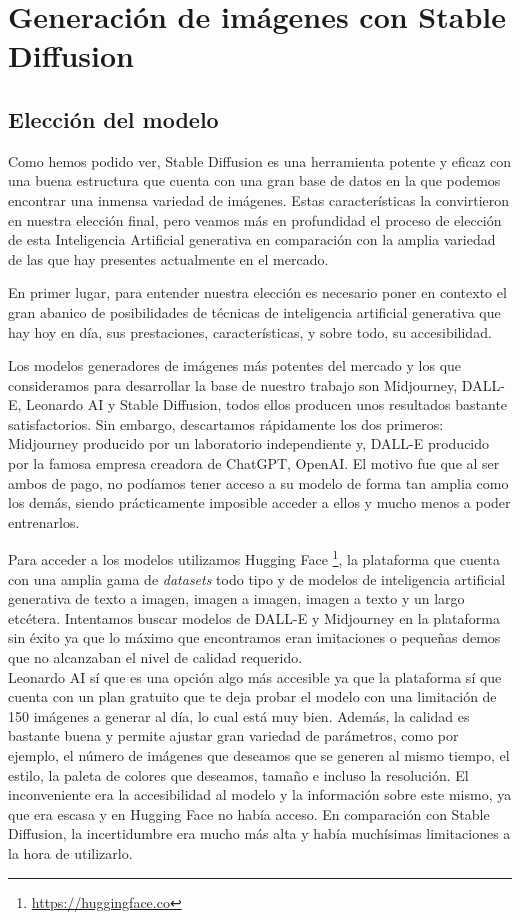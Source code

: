 \chapter{Generación de imágenes con Stable Diffusion}
\label{cap:genimgsia}

\section{Elección del modelo}

Como hemos podido ver, Stable Diffusion es una herramienta potente y eficaz con una buena estructura que cuenta con una gran base de datos en la que podemos encontrar una inmensa variedad de imágenes. Estas características la convirtieron en nuestra elección final, pero veamos más en profundidad el proceso de elección de esta Inteligencia Artificial generativa en comparación con la amplia variedad de las que hay presentes actualmente en el mercado. 

En primer lugar, para entender nuestra elección es necesario poner en contexto el gran abanico de posibilidades de técnicas de inteligencia artificial generativa que hay hoy en día, sus prestaciones, características, y sobre todo, su accesibilidad. 

Los modelos generadores de imágenes más potentes del mercado y los que consideramos para desarrollar la base de nuestro trabajo son Midjourney, DALL-E, Leonardo AI y Stable Diffusion, todos ellos producen unos resultados bastante satisfactorios. Sin embargo, descartamos rápidamente los dos primeros: Midjourney producido por un laboratorio independiente y,
DALL-E producido por la famosa empresa creadora de ChatGPT, OpenAI. El motivo fue que al ser ambos de pago, no podíamos tener acceso a su modelo de forma tan amplia como los demás, siendo prácticamente imposible acceder a ellos y mucho menos a poder entrenarlos. 

Para acceder a los modelos utilizamos Hugging Face \footnote{\url{https://huggingface.co}}, la plataforma  que cuenta con una amplia gama de \textit{datasets} todo tipo y de modelos de inteligencia artificial generativa de texto a imagen, imagen a imagen, imagen a texto y un largo etcétera. Intentamos buscar modelos de DALL-E y Midjourney en la plataforma sin éxito ya que lo máximo que encontramos eran imitaciones o pequeñas demos que no alcanzaban el nivel de calidad requerido. \\


Leonardo AI sí que es una opción algo más accesible ya que la plataforma sí que cuenta con un plan gratuito que te deja probar el modelo con una limitación de 150 imágenes a generar al día, lo cual está muy bien. Además, la calidad es bastante buena y permite ajustar gran variedad de parámetros, como por ejemplo, el número de imágenes que deseamos que se generen al mismo tiempo, el estilo, la paleta de colores que deseamos, tamaño e incluso la resolución. El inconveniente era la accesibilidad al modelo y la información sobre este mismo, ya que era escasa y en Hugging Face no había acceso. En comparación con Stable Diffusion, la incertidumbre era mucho más alta y había muchísimas limitaciones a la hora de utilizarlo. \\

